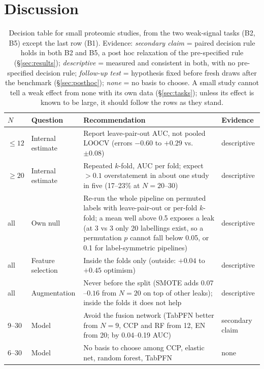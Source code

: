 \documentclass[10pt,letterpaper]{article}
\begin{document}
\section{Discussion}\label{sec:discussion}

\begin{table}[!t]
\centering
\caption{Decision table for small proteomic studies, from the two weak-signal tasks (B2, B5) except the last
row (B1). Evidence: \emph{secondary claim} = paired decision rule holds in both B2 and B5, a post hoc
relaxation of the pre-specified rule (\S\ref{sec:results}); \emph{descriptive} = measured and consistent in
both, with no pre-specified decision rule; \emph{follow-up test} = hypothesis fixed before fresh draws after the
benchmark (\S\ref{sec:posthoc}); \emph{none} = no basis to choose. A small study cannot tell a weak
effect from none with its own data (\S\ref{sec:tasks}); unless its effect is known to be large, it should
follow the rows as they stand.}
\label{tab:decision}
\begin{tabularx}{\textwidth}{@{}l l X l@{}}
\toprule
$N$ & Question & Recommendation & Evidence \\
\midrule
$\le 12$ & Internal estimate & Report leave-pair-out AUC, not pooled LOOCV (errors $-0.60$ to $+0.29$ vs.\ $\pm 0.08$) & descriptive \\
$\ge 20$ & Internal estimate & Repeated $k$-fold, AUC per fold; expect $>0.1$ overstatement in about one study in five (17--23\% at $N = 20$--30) & descriptive \\
all & Own null & Re-run the whole pipeline on permuted labels with leave-pair-out or per-fold $k$-fold; a mean well above 0.5 exposes a leak (at 3 vs 3 only 20 labellings exist, so a permutation $p$ cannot fall below 0.05, or 0.1 for label-symmetric pipelines) & descriptive \\
all & Feature selection & Inside the folds only (outside: $+0.04$ to $+0.45$ optimism) & descriptive \\
all & Augmentation & Never before the split (SMOTE adds $0.07$--$0.16$ from $N = 20$ on top of other leaks); inside the folds it does not help & descriptive \\
9--30 & Model & Avoid the fusion network (TabPFN better from $N = 9$, CCP and RF from 12, EN from 20; by 0.04--0.19 AUC) & secondary claim \\
6--30 & Model & No basis to choose among CCP, elastic net, random forest, TabPFN & none \\

\end{tabularx}
\end{table}
\end{document}

